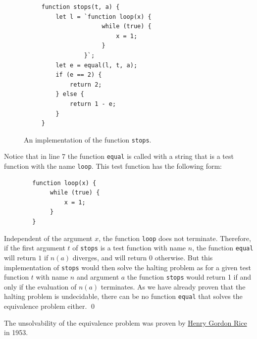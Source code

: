 \begin{figure}[!h]
  \centering
\begin{verbatim}
     function stops(t, a) {
         let l = `function loop(x) { 
                      while (true) {
                          x = 1;
                      }
                 }`;
         let e = equal(l, t, a);
         if (e == 2) {
             return 2;
         } else {
             return 1 - e;
         }
     } 
\end{verbatim}
  \vspace*{-0.3cm}
  \caption{An implementation of the function \texttt{stops}.}
  \label{fig:stops}
\end{figure}

Notice that in line 7 the function \texttt{equal} is called with a string that is a test function with the
name \texttt{loop}.
This test function has the following form:
\begin{verbatim}
        function loop(x) {
             while (true) {
                 x = 1;
             }
        }
\end{verbatim}
Independent of the argument $x$, the function \texttt{loop} does not terminate.
Therefore, if the first argument $t$ of \texttt{stops} is a test function with name $n$, 
the function \texttt{equal} will return $1$ if $n(a)$ diverges, and will return $0$ otherwise.
But this implementation of \texttt{stops} would then solve the halting problem as
for a given test function $t$ with name $n$ and argument $a$ the function \texttt{stops} would
return 1 if and only if the evaluation of $n(a)$ terminates.
As we have already proven that the
halting problem is undecidable, there can be no function \texttt{equal} that solves the equivalence
problem either.
\qed

\remarkEng
The unsolvability of the equivalence problem was proven by \href{http://en.wikipedia.org/wiki/Henry_Gordon_Rice}{Henry Gordon Rice} \cite{rice:1953} in 1953.
\eox


